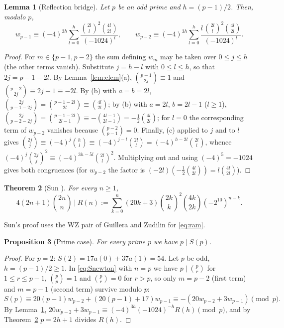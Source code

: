 \documentclass[11pt]{amsart}
\newtheorem{theorem}{Theorem}[section]
\newtheorem{proposition}[theorem]{Proposition}
\newtheorem{lemma}[theorem]{Lemma}
\theoremstyle{definition}
\begin{document}
\begin{lemma}[Reflection bridge]\label{lem:bridge}
Let $p$ be an odd prime and $h=(p-1)/2$. Then, modulo $p$,
\[
w_{p-1}\equiv(-4)^{3h}\sum_{l=0}^{h}\frac{\binom{2l}l^2\binom{4l}{2l}}{(-1024)^l},\qquad
w_{p-2}\equiv(-4)^{3h}\sum_{l=0}^{h}\frac{l\,\binom{2l}l^2\binom{4l}{2l}}{(-1024)^l}.
\]
\end{lemma}

\begin{proof}
For $m\in\{p-1,p-2\}$ the sum defining $w_m$ may be taken over $0\le j\le h$ (the other terms
vanish). Substitute $j=h-l$ with $0\le l\le h$, so that $2j=p-1-2l$. By
Lemma~\ref{lem:elem}(a), $\binom{p-1}{2j}\equiv1$ and $\binom{p-2}{2j}\equiv2j+1\equiv-2l$.
By (b) with $a=b=2l$, $\binom{2j}{p-1-2j}=\binom{p-1-2l}{2l}\equiv\binom{4l}{2l}$; by (b) with
$a=2l$, $b=2l-1$ ($l\ge1$), $\binom{2j}{p-2-2j}=\binom{p-1-2l}{2l-1}\equiv-\binom{4l-1}{2l-1}
=-\tfrac12\binom{4l}{2l}$; for $l=0$ the corresponding term of $w_{p-2}$ vanishes because
$\binom{p-2}{p-1}=0$. Finally, (c) applied to $j$ and to $l$ gives
$\binom{2j}j\equiv(-4)^j\binom hl\equiv(-4)^{j-l}\binom{2l}l=(-4)^{h-2l}\binom{2l}l$, whence
$(-4)^j\binom{2j}j^2\equiv(-4)^{3h-5l}\binom{2l}l^2$. Multiplying out and using $(-4)^5=-1024$
gives both congruences (for $w_{p-2}$ the factor is $(-2l)(-\tfrac12\binom{4l}{2l})=l\binom{4l}{2l}$).
\end{proof}

\begin{theorem}[Sun {\cite[Theorem 1.2, (1.5)]{SunEJC}}]\label{thm:sunejc}
For every $n\ge1$,
\[
4(2n+1)\binom{2n}n\ \Big|\ R(n):=\sum_{k=0}^{n}(20k+3)\binom{2k}k^2\binom{4k}{2k}(-2^{10})^{n-k}.
\]
\end{theorem}

Sun's proof uses the WZ pair of Guillera and Zudilin \cite{Gu,Zu} for \eqref{eq:ram}.

\begin{proposition}[Prime case]\label{prop:prime}
For every prime $p$ we have $p\mid S(p)$.
\end{proposition}

\begin{proof}
For $p=2$: $S(2)=17a(0)+37a(1)=54$. Let $p$ be odd, $h=(p-1)/2\ge1$. In \eqref{eq:Snewton} with
$n=p$ we have $p\mid\binom pr$ for $1\le r\le p-1$, $\binom pp=1$ and $\binom pr=0$ for $r>p$, so
only $m=p-2$ (first term) and $m=p-1$ (second term) survive modulo $p$:
\[
S(p)\equiv20(p-1)w_{p-2}+(20(p-1)+17)w_{p-1}\equiv-(20w_{p-2}+3w_{p-1})\pmod p .
\]
By Lemma~\ref{lem:bridge},
$20w_{p-2}+3w_{p-1}\equiv(-4)^{3h}(-1024)^{-h}R(h)\pmod p$, and by Theorem~\ref{thm:sunejc}
$p=2h+1$ divides $R(h)$.
\end{proof}
\end{document}
